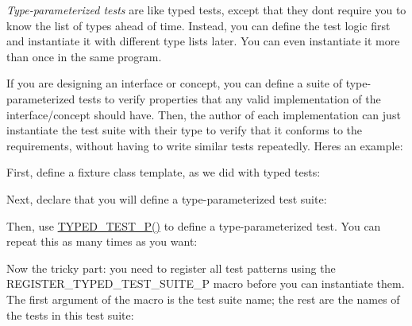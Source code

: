{\itshape Type-\/parameterized tests} are like typed tests, except that they don\textquotesingle{}t require you to know the list of types ahead of time. Instead, you can define the test logic first and instantiate it with different type lists later. You can even instantiate it more than once in the same program.

If you are designing an interface or concept, you can define a suite of type-\/parameterized tests to verify properties that any valid implementation of the interface/concept should have. Then, the author of each implementation can just instantiate the test suite with their type to verify that it conforms to the requirements, without having to write similar tests repeatedly. Here\textquotesingle{}s an example\+:

First, define a fixture class template, as we did with typed tests\+:


\begin{DoxyCode}{0}
\DoxyCodeLine{\};}
\end{DoxyCode}


Next, declare that you will define a type-\/parameterized test suite\+:


\begin{DoxyCode}{0}
\end{DoxyCode}


Then, use {\ttfamily \mbox{\hyperlink{googletest-master_2googletest_2test_2googletest-list-tests-unittest___8cc_aadd51dfff9d63b5e0faa0130697684c1}{T\+Y\+P\+E\+D\+\_\+\+T\+E\+S\+T\+\_\+\+P()}}} to define a type-\/parameterized test. You can repeat this as many times as you want\+:


\begin{DoxyCode}{0}
\DoxyCodeLine{\}}
\DoxyCodeLine{}
\end{DoxyCode}


Now the tricky part\+: you need to register all test patterns using the {\ttfamily R\+E\+G\+I\+S\+T\+E\+R\+\_\+\+T\+Y\+P\+E\+D\+\_\+\+T\+E\+S\+T\+\_\+\+S\+U\+I\+T\+E\+\_\+P} macro before you can instantiate them. The first argument of the macro is the test suite name; the rest are the names of the tests in this test suite\+:


